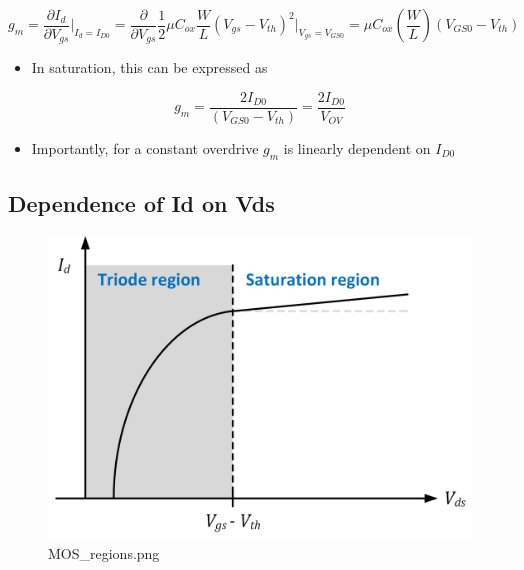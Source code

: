 \documentclass[11pt]{article}
\providecommand{\tightlist}{%
      \setlength{\itemsep}{0pt}\setlength{\parskip}{0pt}}
\begin{document}
\begin{equation}
g_m = \dfrac{\partial I_d}{\partial V_{gs}}\bigg\rvert_{I_d = I_{D0}} = \dfrac{\partial}{\partial V_{gs}} \dfrac{1}{2}\mu C_{ox} \dfrac{W}{L} (V_{gs} - V_{th})^2 \bigg\rvert_{V_{gs} = V_{GS0}}= \mu C_{ox} \left(\dfrac{W}{L} \right) (V_{GS0} - V_{th})
\end{equation}

\begin{itemize}
\tightlist
\item
  In saturation, this can be expressed as
\end{itemize}

\begin{equation}
g_m = \dfrac{2I_{D0}}{(V_{GS0} - V_{th})} = \dfrac{2I_{D0}}{V_{OV}}
\end{equation}

\begin{itemize}
\tightlist
\item
  Importantly, for a constant overdrive \(g_m\) is linearly dependent on
  \(I_{D0}\)
\end{itemize}

    \hypertarget{dependence-of-id-on-vds}{%
\subsection{Dependence of Id on Vds}\label{dependence-of-id-on-vds}}

    \begin{figure}
\centering
\includegraphics{MOS_regions.png}
\caption{MOS\_regions.png}
\end{figure}
\end{document}
